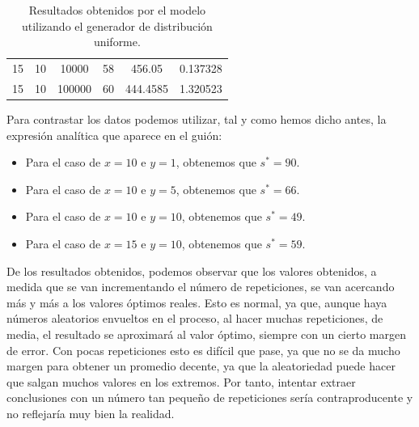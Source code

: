 \documentclass[11pt,a4paper]{report}
\begin{document}
\begin{table}[H]
{\begin{tabular}{c|c|c|c|c|c}
15                                                                                   & 10                                                                                     & 10000                                                                     & 58                                                                                        & 456.05                                                                    & 0.137328              \\
15                                                                                   & 10                                                                                     & 100000                                                                    & 60                                                                                        & 444.4585                                                                  & 1.320523             
\end{tabular}
}%
\caption{Resultados obtenidos por el modelo utilizando el generador de distribución uniforme.}
\label{tabla1}
\end{table}

Para contrastar los datos podemos utilizar, tal y como hemos dicho antes, la expresión analítica que aparece en el guión:

\begin{itemize}
	\item Para el caso de $x = 10$ e $y = 1$, obtenemos que $s^* = 90$.
	\item Para el caso de $x = 10$ e $y = 5$, obtenemos que $s^* = 66$.
	\item Para el caso de $x = 10$ e $y = 10$, obtenemos que $s^* = 49$.
	\item Para el caso de $x = 15$ e $y = 10$, obtenemos que $s^* = 59$. 
\end{itemize}

De los resultados obtenidos, podemos observar que los valores obtenidos, a medida que se van incrementando el número de
repeticiones, se van acercando más y más a los valores óptimos reales. Esto es normal, ya que, aunque haya números aleatorios
envueltos en el proceso, al hacer muchas repeticiones, de media, el resultado se aproximará al valor óptimo, siempre con
un cierto margen de error. Con pocas repeticiones esto es difícil que pase, ya que no se da mucho margen para
obtener un promedio decente, ya que la aleatoriedad puede hacer que salgan muchos valores en los extremos. Por tanto,
intentar extraer conclusiones con un número tan pequeño de repeticiones sería contraproducente y no reflejaría muy bien
la realidad.
\end{document}
